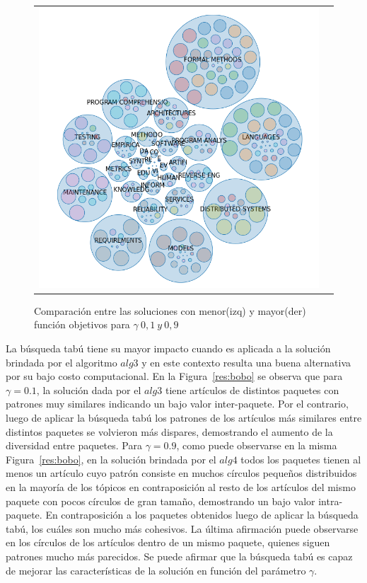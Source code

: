 \begin{figure}[H]
\begin{tabular}{cc}
			\includegraphics[width=0.5\linewidth]{img/gamma-09-burbujas-alg-1.png}\\
	\end{tabular}
	\caption{Comparación entre las soluciones con menor(izq) y mayor(der) función objetivos  para $\gamma\ 0,1\ y\ 0,9$}
	\label{res:comp1}
\end{figure}

La búsqueda tabú tiene su mayor impacto cuando es aplicada a la solución brindada por el algoritmo $alg3$ y en este contexto resulta una buena alternativa por su bajo costo computacional. En la Figura~\ref{res:bobo} se observa que para $\gamma=0.1$, la solución dada por el $alg3$ tiene artículos de distintos paquetes con patrones muy similares indicando un bajo valor inter-paquete. Por el contrario, luego de aplicar la búsqueda tabú los patrones de los artículos más similares entre distintos paquetes se volvieron más dispares, demostrando el aumento de la diversidad entre paquetes. Para $\gamma=0.9$, como puede observarse en la misma Figura~\ref{res:bobo}, en la solución brindada por el $alg4$ todos los paquetes tienen al menos un artículo cuyo patrón consiste en muchos círculos pequeños distribuidos en la mayoría de los tópicos en contraposición al resto de los artículos del mismo paquete con pocos círculos de gran tamaño, demostrando un bajo valor intra-paquete. En contraposición a los paquetes obtenidos luego de aplicar la búsqueda tabú, los cuáles son mucho más cohesivos. La última afirmación puede observarse en los círculos de los artículos dentro de un mismo paquete, quienes siguen patrones mucho más parecidos. Se puede afirmar que la búsqueda tabú es capaz de mejorar las características de la solución en función del parámetro $\gamma$.

